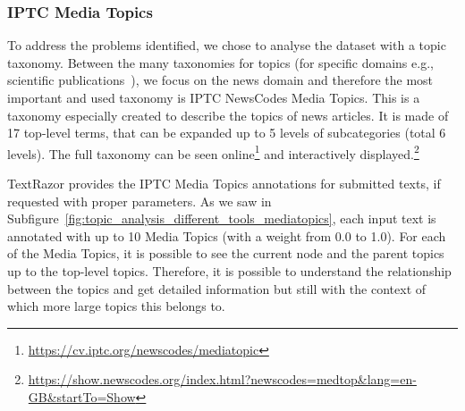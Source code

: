 



\subsubsection{\statusgreen IPTC Media Topics}

To address the problems identified, %
we chose to analyse the dataset with a topic taxonomy.
Between the many taxonomies for topics (for specific domains e.g., scientific publications~\citep{vayansky2020review,churchill2022evolution}), we focus on the news domain and therefore the most important and used taxonomy is IPTC NewsCodes Media Topics.
This is a taxonomy especially created to describe the topics of news articles. It is made of 17 top-level terms, that can be expanded up to 5 levels of subcategories (total 6 levels).
The full taxonomy can be seen online\footnote{\url{https://cv.iptc.org/newscodes/mediatopic}} and interactively displayed.\footnote{\url{https://show.newscodes.org/index.html?newscodes=medtop&lang=en-GB&startTo=Show}}




TextRazor provides the IPTC Media Topics annotations for submitted texts, if requested with proper parameters.
As we saw in Subfigure~\ref{fig:topic_analysis_different_tools_mediatopics}, each input text is annotated with up to 10 Media Topics (with a weight from 0.0 to 1.0). For each of the Media Topics, it is possible to see the current node and the parent topics up to the top-level topics.
Therefore, it is possible to understand the relationship between the topics and get detailed information but still with the context of which more large topics this belongs to.


